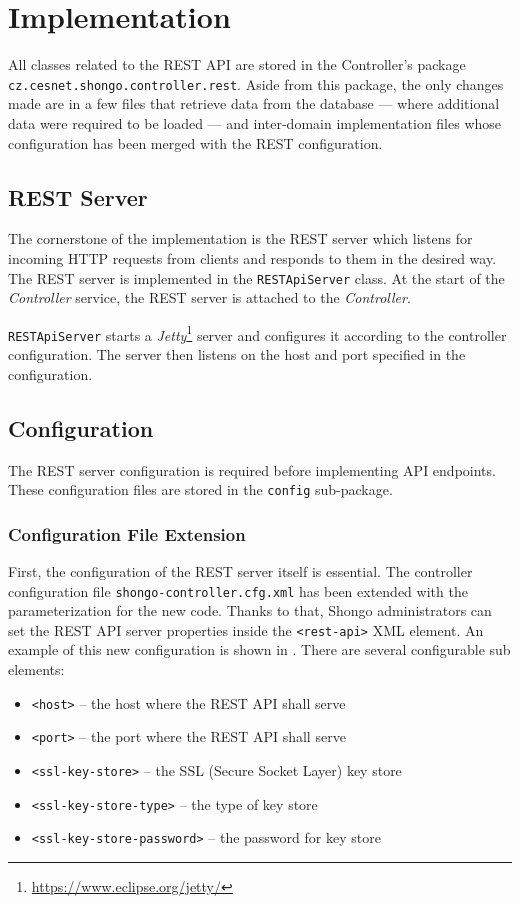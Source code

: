 \chapter{Implementation}
All classes related to the REST API are stored in the Controller’s package  \texttt{cz.cesnet.shongo.controller.rest}.
Aside from this package, the only changes made are in a few files that retrieve data from the database --- where additional data were required to be loaded --- and inter-domain implementation files\cite{pavelka2016shongo} whose configuration has been merged with the REST configuration.

\section{REST Server}
The cornerstone of the implementation is the REST server which listens for incoming HTTP requests from clients and responds to them in the desired way. The REST server is implemented in the \texttt{RESTApiServer} class.
At the start of the \emph{Controller} service, the REST server is attached to the \emph{Controller}.

\texttt{RESTApiServer} starts a \emph{Jetty}\footnote{\url{https://www.eclipse.org/jetty/}} server and configures it according to the controller configuration. The server then listens on the host and port specified in the configuration.

\section{Configuration}
The REST server configuration is required before implementing API endpoints. These configuration files are stored in the \texttt{config} sub-package.

\subsection{Configuration File Extension}
First, the configuration of the REST server itself is essential. The controller configuration file \texttt{shongo-controller.cfg.xml} has been extended with the parameterization for the new code. Thanks to that, Shongo administrators can set the REST API server properties inside the \texttt{<rest-api>} XML element. An example of this new configuration is shown in . There are several configurable sub elements:
\begin{itemize}
    \item \texttt{<host>} -- the host where the REST API shall serve
    \item \texttt{<port>} -- the port where the REST API shall serve
    \item \texttt{<ssl-key-store>} -- the SSL (Secure Socket Layer) key store
    \item \texttt{<ssl-key-store-type>} -- the type of key store
    \item \texttt{<ssl-key-store-password>} -- the password for key store
\end{itemize}

